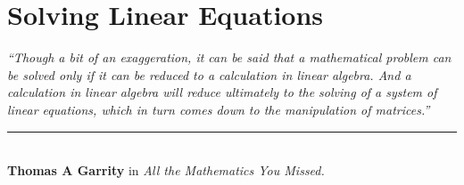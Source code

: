 \chapter{Solving Linear Equations}\label{chp:lineqsolve}


\begin{flushright}
\textit{``Though a bit of an exaggeration, it can be said that a mathematical problem can be solved only if it can be reduced to a calculation in linear algebra. And a calculation in linear algebra will reduce ultimately to the solving of a system of linear equations, which in turn comes down to the manipulation of matrices.''}\\
\rule{0.5\textwidth}{.4pt}\\
\textbf{Thomas A Garrity} \small{in \textit{All the Mathematics You Missed.}}
\end{flushright}


    
